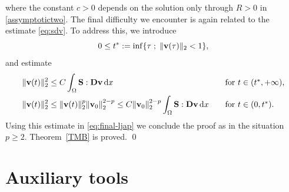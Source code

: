 \documentclass[11pt, a4paper, reqno]{amsart}
\numberwithin{equation}{section}
\newcommand{\vc}[1]{{\bf #1}}
\newcommand{\vv}{\vc{v}}
\renewcommand{\S}{\mathbf{S}}
\newcommand{\D}{\mathbf{D}}
\newcommand{\dx}{\,{\rm d} {x}}
\newcommand{\intO}[1]{\int_{\Omega} #1 \dx}
\newcommand{\nm}[1]{\|#1\|}
\newcommand{\tstar}{t^*}
\begin{document}
where the constant $c>0$ depends on the solution only through $R>0$ in \eqref{assymptotictwo}.  
The final difficulty we encounter is again related to the estimate \eqref{eq:sdv}. To address this, we introduce
\[
  0 \leq \tstar := \inf\{ \tau \; ; \; \nm{\vv(\tau)}_{2} < 1 \},
\]
and estimate
$$
\begin{aligned}
\nm{\vv(t)}_2^2&\leq C\intO{\S:\D{\vv}}\quad&&\mbox{for $t\in(\tstar,+\infty)$,}\\
\nm{\vv(t)}_2^2&\leq {\nm{\vv(t)}_2^p}{\nm{\vv_0}}_2^{2-p} \leq C\nm{\vv_0}_2^{2-p}\intO{\S:\D{\vv}}\quad&&\mbox{for $t\in(0,\tstar)$.}
\end{aligned}
$$
Using this estimate in \eqref{eq:final-ljap} we conclude the proof as in the situation $p\geq2$. Theorem~\ref{TMB} is proved. \qed


\appendix
\section{Auxiliary tools}
\end{document}
